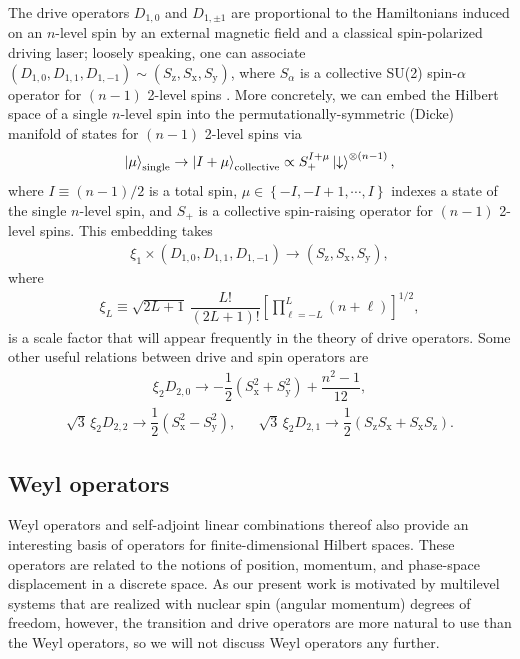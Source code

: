 \documentclass[nofootinbib,notitlepage,11pt]{revtex4-2}
\renewcommand{\t}{\text} %
\newcommand{\f}[2]{\dfrac{#1}{#2}} %
\newcommand{\p}[1]{\left(#1\right)} %
\renewcommand{\sp}[1]{\left[#1\right]} %
\renewcommand{\set}[1]{\left\{#1\right\}} %
\newcommand{\1}{\mathds{1}}
\newcommand{\dn}{\downarrow}
\newcommand{\x}{\text{x}}
\newcommand{\y}{\text{y}}
\newcommand{\z}{\text{z}}
\begin{document}
The drive operators $D_{1,0}$ and $D_{1,\pm1}$ are proportional to the
Hamiltonians induced on an $n$-level spin by an external magnetic
field and a classical spin-polarized driving laser; loosely speaking,
one can associate
$\p{D_{1,0},D_{1,1},D_{1,-1}}\sim\p{S_\z,S_\x,S_\y}$, where $S_\alpha$
is a collective SU(2) spin-$\alpha$ operator for $\p{n-1}$ 2-level
spins \cite{perlin2020shorttime}.  More concretely, we can embed the
Hilbert space of a single $n$-level spin into the
permutationally-symmetric (Dicke) manifold of states for $\p{n-1}$
2-level spins via
\begin{align}
  \ket{\mu}_{\t{single}} \to \ket{I+\mu}_{\t{collective}}
  \propto S_+^{I+\mu} \ket\dn^{\otimes\p{n-1}},
  \label{eq:collective_embedding}
\end{align}
where $I\equiv\p{n-1}/2$ is a total spin,
$\mu\in\set{-I,-I+1,\cdots,I}$ indexes a state of the single $n$-level
spin, and $S_+$ is a collective spin-raising operator for $\p{n-1}$
2-level spins.  This embedding takes
\begin{align}
  \xi_1 \times \p{D_{1,0}, D_{1,1}, D_{1,-1}}
  \to \p{S_\z, S_\x, S_\y},
  \label{eq:spin_ops}
\end{align}
where
\begin{align}
  \xi_L
  \equiv \sqrt{2L+1}\, \f{L!}{\p{2L+1}!}
  \sp{\prod_{\ell=-L}^L\p{n+\ell}}^{1/2},
  \label{eq:scale_fac}
\end{align}
is a scale factor that will appear frequently in the theory of drive
operators.  Some other useful relations between drive and spin
operators are
\begin{align}
  \xi_2 D_{2,0} \to -\f12\p{S_\x^2 + S_\y^2} + \f{n^2-1}{12},
  \label{eq:spin_ops_2_0}
\end{align}
\begin{align}
  \sqrt{3}\, \xi_2 D_{2,2} \to \f12\p{S_\x^2 - S_\y^2},
  &&
  \sqrt{3}\, \xi_2 D_{2,1} \to \f12\p{S_\z S_\x + S_\x S_\z}.
  \label{eq:spin_ops_2_12}
\end{align}

\subsection{Weyl operators}

Weyl operators \cite{bertlmann2008bloch} and self-adjoint linear
combinations thereof \cite{asadian2016heisenbergweyl} also provide an
interesting basis of operators for finite-dimensional Hilbert spaces.
These operators are related to the notions of position, momentum, and
phase-space displacement in a discrete space.  As our present work is
motivated by multilevel systems that are realized with nuclear spin
(angular momentum) degrees of freedom, however, the transition and
drive operators are more natural to use than the Weyl operators, so we
will not discuss Weyl operators any further.
\end{document}
